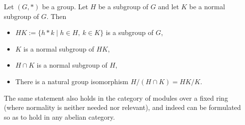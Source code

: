 \documentclass{article}
\begin{document}
Let $(G,*)$ be a group. Let $H$ be a subgroup of $G$ and let $K$ be a normal subgroup of $G$. Then
\begin{itemize}
\item $HK := \{ h*k \mid h \in H,\ k \in K \}$ is a subgroup of $G$,
\item $K$ is a normal subgroup of $HK$,
\item $H \cap K$ is a normal subgroup of $H$,
\item There is a natural group isomorphism $H/(H \cap K) = HK/K$.
\end{itemize}

The same statement also holds in the category of modules over a fixed ring (where normality is neither needed nor relevant), and indeed can be formulated so as to hold in any abelian category.
\end{document}
